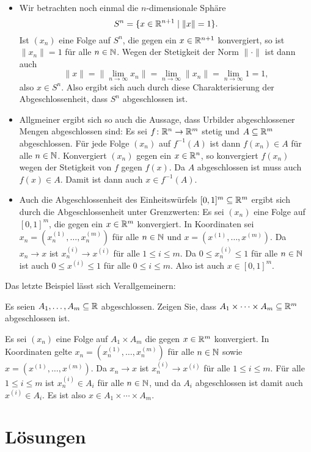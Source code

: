 \documentclass[a4paper,10pt]{article}
\begin{document}
\begin{bsp}
 \begin{itemize}
  \item
   Wir betrachten noch einmal die $n$-dimensionale Sphäre
   \[
    S^n = \{x \in \mathbb{R}^{n+1} \mid \|x\| = 1\}.
   \]
   Ist $(x_n)$ eine Folge auf $S^n$, die gegen ein $x \in \mathbb{R}^{n+1}$ konvergiert, so ist $\|x_n\| = 1$ für alle $n \in \mathbb{N}$. Wegen der Stetigkeit der Norm $\|\cdot\|$ ist dann auch
   \[
    \|x\|
    = \|\lim_{n \to \infty} x_n\|
    = \lim_{n \to \infty} \|x_n\|
    = \lim_{n \to \infty} 1
    = 1,
   \]
   also $x \in S^n$. Also ergibt sich auch durch diese Charakterisierung der Abgeschlossenheit, dass $S^n$ abgeschlossen ist.
  \item
   Allgmeiner ergibt sich so auch die Aussage, dass Urbilder abgeschlossener Mengen abgeschlossen sind: Es sei $f \colon \mathbb{R}^n \to \mathbb{R}^m$ stetig und $A \subseteq \mathbb{R}^m$ abgeschlossen. Für jede Folge $(x_n)$ auf $f^{-1}(A)$ ist dann $f(x_n) \in A$ für alle $n \in \mathbb{N}$. Konvergiert $(x_n)$ gegen ein $x \in \mathbb{R}^n$, so konvergiert $f(x_n)$ wegen der Stetigkeit von $f$ gegen $f(x)$. Da $A$ abgeschlossen ist muss auch $f(x) \in A$. Damit ist dann auch $x \in f^{-1}(A)$.
  \item
   Auch die Abgeschlossenheit des Einheitswürfels $[0,1]^m \subseteq \mathbb{R}^m$ ergibt sich durch die Abgeschlossenheit unter Grenzwerten: Es sei $(x_n)$ eine Folge auf $[0,1]^m$, die gegen ein $x \in \mathbb{R}^m$ konvergiert. In Koordinaten sei $x_n = (x^{(1)}_n, \dotsc, x^{(m)}_n)$ für alle $n \in \mathbb{N}$ und $x = (x^{(1)}, \dotsc, x^{(m)})$. Da $x_n \to x$ ist $x^{(i)}_n \to x^{(i)}$ für alle $1 \leq i \leq m$. Da $0 \leq x^{(i)}_n \leq 1$ für alle $n \in \mathbb{N}$ ist auch $0 \leq x^{(i)} \leq 1$ für alle $0 \leq i \leq m$. Also ist auch $x \in [0,1]^m$.
 \end{itemize}
\end{bsp}


Das letzte Beispiel lässt sich Verallgemeinern:


\begin{question}
 Es seien $A_1, \dotsc, A_m \subseteq \mathbb{R}$ abgeschlossen. Zeigen Sie, dass $A_1 \times \dotsb \times A_m \subseteq \mathbb{R}^m$ abgeschlossen ist.
\end{question}
\begin{solution}
 Es sei $(x_n)$ eine Folge auf $A_1 \times A_m$ die gegen $x \in \mathbb{R}^m$ konvergiert. In Koordinaten gelte $x_n = (x^{(1)}_n, \dotsc, x^{(m)}_n)$ für alle $n \in \mathbb{N}$ sowie $x = (x^{(1)}, \dotsc, x^{(m)})$. Da $x_n \to x$ ist $x^{(i)}_n \to x^{(i)}$ für alle $1 \leq i \leq m$. Für alle $1 \leq i \leq m$ ist $x^{(i)}_n \in A_i$ für alle $n \in \mathbb{N}$, und da $A_i$ abgeschlossen ist damit auch $x^{(i)} \in A_i$. Es ist also $x \in A_1 \times \dotsb \times A_m$.
\end{solution}





\newpage

\section{Lösungen}

\printsolutions
\end{document}
